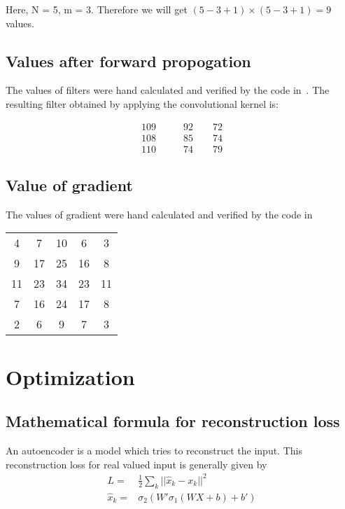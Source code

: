 \documentclass{article}
\begin{document}
Here, N = 5, m = 3.
Therefore we will get $(5-3+1) \times (5-3+1) = 9$ values.
\subsection{Values after forward propogation}
The values of filters were hand calculated and verified by the code in~\cite{website:convolution_code}.
The resulting filter obtained by applying the convolutional kernel is:

\begin{centering}
  \begin{align*}
  109 &\qquad 92 \qquad 72 \\
  108 &\qquad 85 \qquad 74 \\
  110 &\qquad 74 \qquad 79
  \end{align*}
\end{centering}

\subsection{Value of gradient}
The values of gradient were hand calculated and verified by the code in~\cite{website:convolution_code}
\begin{center}
\begin{tabular}{c c c c c }
   4 &   7  &  10  &   6  &   3 \\
   9 &  17  &  25 &   16 &    8 \\
  11 & 23  &  34 &   23 &   11 \\
   7 & 16 &   24 &   17 &    8 \\
   2 &  6 &    9 &    7 &    3
\end{tabular}
\end{center}

\section{Optimization}
\subsection{Mathematical formula for reconstruction loss}
An autoencoder is a model which tries to reconstruct the input.  This reconstruction loss for real valued input is generally given by 
\begin{align*}
  L =& \frac{1}{2} \sum_{k}{\lvert\lvert \hat{x}_{k} - x_{k} \rvert\rvert}^{2} \\
  \hat{x}_{k} =& \sigma_{2}(W'\sigma_{1}(WX + b) + b')
\end{align*}
\end{document}
